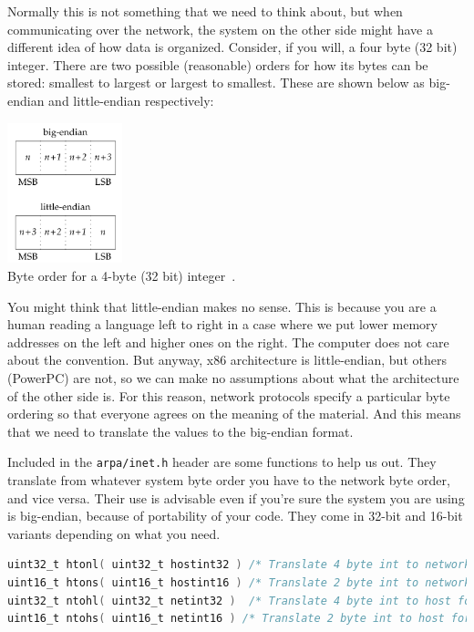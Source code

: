 Normally this is not something that we need to think about, but when communicating over the network, the system on the other side might have a different idea of how data is organized. Consider, if you will, a four byte (32 bit) integer. There are two possible (reasonable) orders for how its bytes can be stored: smallest to largest or largest to smallest. These are shown below as big-endian and little-endian respectively:

\begin{center}
	\includegraphics[width=0.25\textwidth]{images/endian}\\
	Byte order for a 4-byte (32 bit) integer~\cite{apunix}.
\end{center}

You might think that little-endian makes no sense. This is because you are a human reading a language left to right in a case where we put lower memory addresses on the left and higher ones on the right. The computer does not care about the convention. But anyway, x86 architecture is little-endian, but others (PowerPC) are not, so we can make no assumptions about what the architecture of the other side is. For this reason, network protocols specify a particular byte ordering so that everyone agrees on the meaning of the material. And this means that we need to translate the values to the big-endian format. 

Included in the \texttt{arpa/inet.h} header are some functions to help us out. They translate from whatever system byte order you have to the network byte order, and vice versa. Their use is advisable even if you're sure the system you are using is big-endian, because of portability of your code. They come in 32-bit and 16-bit variants depending on what you need.

\begin{lstlisting}[language=C]
uint32_t htonl( uint32_t hostint32 ) /* Translate 4 byte int to network format */
uint16_t htons( uint16_t hostint16 ) /* Translate 2 byte int to network format */
uint32_t ntohl( uint32_t netint32 )  /* Translate 4 byte int to host format */
uint16_t ntohs( uint16_t netint16 ) /* Translate 2 byte int to host format */
\end{lstlisting}

